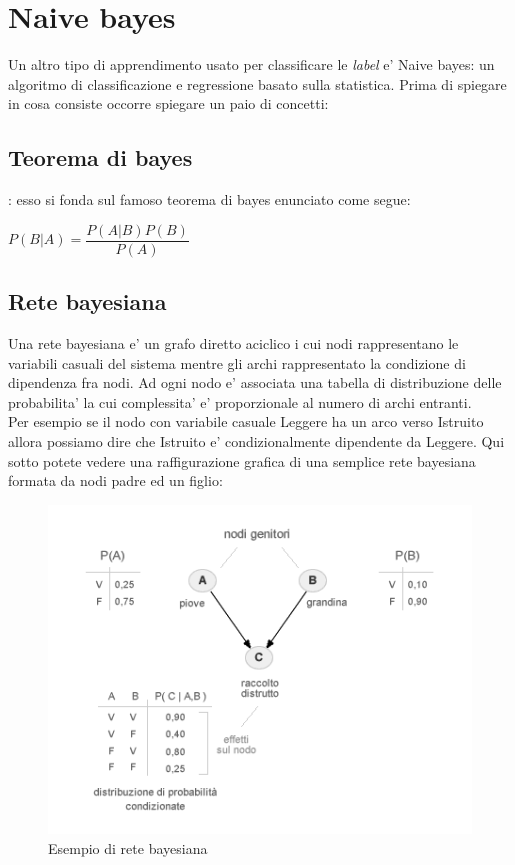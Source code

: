 \section*{Naive bayes}
Un altro tipo di apprendimento usato per classificare le \textit{label} e' Naive bayes: un algoritmo di classificazione e regressione basato sulla statistica. Prima di spiegare in cosa consiste occorre spiegare un paio di concetti:
\subsection*{Teorema di bayes}
: esso si fonda sul famoso teorema di bayes enunciato come segue:
\begin{center}
	$P(B|A) = \dfrac{P(A|B)P(B)}{P(A)}$
\end{center}
\subsection*{Rete bayesiana}
Una rete bayesiana e' un grafo diretto aciclico i cui nodi rappresentano le variabili casuali del sistema mentre gli archi rappresentato la condizione di dipendenza fra nodi.
 Ad ogni nodo e' associata una tabella di distribuzione delle probabilita' la cui complessita' e' proporzionale al numero di archi entranti.\\ Per esempio se il nodo con variabile casuale Leggere ha un arco verso Istruito allora possiamo dire che Istruito e' condizionalmente dipendente da Leggere. Qui sotto potete vedere una raffigurazione grafica di una semplice rete bayesiana formata da nodi padre ed un figlio:
\begin{figure}[H]
	\centering
	\includegraphics[width=0.7\linewidth]{img/rete-bayesiana-grafo.png}
	\caption{Esempio di rete bayesiana}
	\label{fig:rete-bayesiana-grafo}
\end{figure}
\medskip
